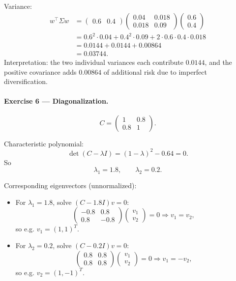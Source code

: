 \documentclass[11pt]{article}
\begin{document}
Variance:
\begin{align*}
w^\top \Sigma w
&= 
\begin{pmatrix}0.6 & 0.4\end{pmatrix}
\begin{pmatrix}
0.04 & 0.018\\
0.018 & 0.09
\end{pmatrix}
\begin{pmatrix}
0.6\\0.4
\end{pmatrix}\\
&= 0.6^2\cdot 0.04 + 0.4^2\cdot 0.09 + 2\cdot 0.6\cdot 0.4\cdot 0.018\\
&= 0.0144 + 0.0144 + 0.00864\\
&= 0.03744.
\end{align*}
Interpretation: the two individual variances each contribute $0.0144$, and the positive covariance adds $0.00864$ of additional risk due to imperfect diversification.

\bigskip

\paragraph{Exercise 6 — Diagonalization.}

\[
C = \begin{pmatrix}1 & 0.8\\ 0.8 & 1\end{pmatrix}.
\]

Characteristic polynomial:
\[
\det(C-\lambda I)
=
(1-\lambda)^2 - 0.64
=0.
\]
So
\[
\lambda_1 = 1.8,\qquad
\lambda_2 = 0.2.
\]

Corresponding eigenvectors (unnormalized):
\begin{itemize}
\item For $\lambda_1=1.8$, solve $(C-1.8I)v=0$:
\[
\begin{pmatrix}
-0.8 & 0.8\\
0.8 & -0.8
\end{pmatrix}
\begin{pmatrix}v_1\\v_2\end{pmatrix}
=0
\Rightarrow v_1=v_2,
\]
so e.g. $v_1=(1,1)^T$.

\item For $\lambda_2=0.2$, solve $(C-0.2I)v=0$:
\[
\begin{pmatrix}
0.8 & 0.8\\
0.8 & 0.8
\end{pmatrix}
\begin{pmatrix}v_1\\v_2\end{pmatrix}
=0
\Rightarrow v_1=-v_2,
\]
so e.g. $v_2=(1,-1)^T$.
\end{itemize}
\end{document}
